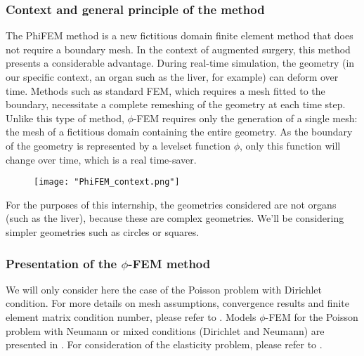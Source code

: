 
\subsubsection{Context and general principle of the method}

The PhiFEM method is a new fictitious domain finite element method that does not require a boundary mesh. In the context of augmented surgery, this method presents a considerable advantage. During real-time simulation, the geometry (in our specific context, an organ such as the liver, for example) can deform over time. Methods such as standard FEM, which requires a mesh fitted to the boundary, necessitate a complete remeshing of the geometry at each time step. Unlike this type of method, $\phi$-FEM requires only the generation of a single mesh: the mesh of a fictitious domain containing the entire geometry. As the boundary of the geometry is represented by a levelset function $\phi$, only this function will change over time, which is a real time-saver.

\begin{figure}[H]
	\centering
	\texttt{[image: "PhiFEM\_context.png"]}
	\label{context}
\end{figure}

\begin{Rem}
	For the purposes of this internship, the geometries considered are not organs (such as the liver), because these are complex geometries. We'll be considering simpler geometries such as circles or squares. 
\end{Rem}

\subsubsection{Presentation of the $\phi$-FEM method}

We will only consider here the case of the Poisson problem with Dirichlet condition. For more details on mesh assumptions, convergence results and finite element matrix condition number, please refer to . Models $\phi$-FEM for the Poisson problem with Neumann or mixed conditions (Dirichlet and Neumann) are presented in . For consideration of the elasticity problem, please refer to .


